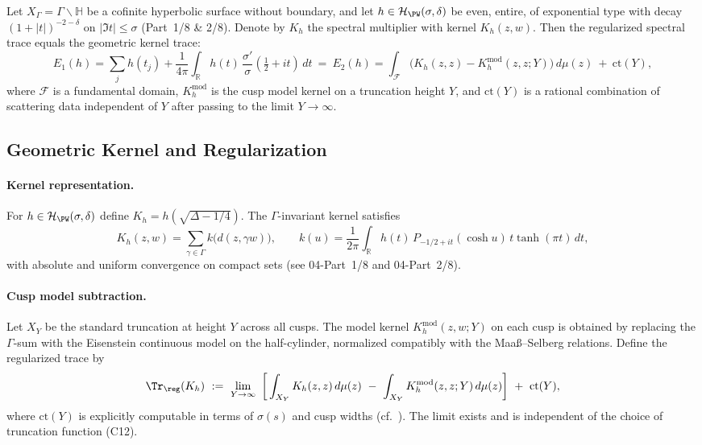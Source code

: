 \begin{tcolorbox}[colback=gray!4,colframe=gray!45,title={Statement (sealed) • C5–C9, C12}] %
Let $X_\Gamma=\Gamma\backslash\mathbb{H}$ be a cofinite hyperbolic surface without boundary, and let $h\in\mathcal{H}_{\PW}(\sigma,\delta)$ be even, entire, of exponential type with decay $(1+|t|)^{-2-\delta}$ on $|\Im t|\le\sigma$ (Part~1/8 \& 2/8). Denote by $K_h$ the spectral multiplier with kernel $K_h(z,w)$. Then the regularized spectral trace equals the geometric kernel trace:
\[
E_{1}(h)=\sum_{j}h(t_j)+\frac{1}{4\pi}\int_{\mathbb{R}}h(t)\,\frac{\sigma'}{\sigma}\!\left(\tfrac12+it\right)\,dt
\ =\ E_{2}(h)=\int_{\mathcal{F}} \Big( K_h(z,z)- K_h^{\mathrm{mod}}(z,z;Y)\Big)\,d\mu(z)\ +\ \mathrm{ct}(Y),
\]
where $\mathcal{F}$ is a fundamental domain, $K_h^{\mathrm{mod}}$ is the cusp model kernel on a truncation height $Y$, and $\mathrm{ct}(Y)$ is a rational combination of scattering data independent of $Y$ after passing to the limit $Y\to\infty$. %
\end{tcolorbox}

\subsection{Geometric Kernel and Regularization}\relax\hspace{0pt}
\label{subsec:geom-ker-reg}\relax\hspace{0pt}

\paragraph{Kernel representation.}\relax
For $h\in\mathcal{H}_{\PW}(\sigma,\delta)$ define $K_h=h(\sqrt{\Delta-1/4})$. The $\Gamma$-invariant kernel satisfies
\[
K_h(z,w)=\sum_{\gamma\in\Gamma}k\big(d(z,\gamma w)\big),\qquad
k(u)=\frac{1}{2\pi}\int_{\mathbb{R}}h(t)\,P_{-1/2+it}(\cosh u)\,t\tanh(\pi t)\,dt,
\]
with absolute and uniform convergence on compact sets (see 04-Part~1/8 and 04-Part~2/8). %

\paragraph{Cusp model subtraction.}\relax
Let $X_Y$ be the standard truncation at height $Y$ across all cusps. The model kernel $K_h^{\mathrm{mod}}(z,w;Y)$ on each cusp is obtained by replacing the $\Gamma$-sum with the Eisenstein continuous model on the half-cylinder, normalized compatibly with the Maaß–Selberg relations. Define the regularized trace by
\[
\Tr_{\reg}(K_h)\ :=\ \lim_{Y\to\infty}\ \left[\,\int_{X_Y}K_h(z,z)\,d\mu(z)\ -\ \int_{X_Y}K_h^{\mathrm{mod}}(z,z;Y)\,d\mu(z)\right]\ +\ \mathrm{ct}(Y),
\]
where $\mathrm{ct}(Y)$ is explicitly computable in terms of $\sigma(s)$ and cusp widths (cf.\ \cite{Hejhal1983-II,Borthwick2020,LaxPhillips1989}). The limit exists and is independent of the choice of truncation function (C12). %

